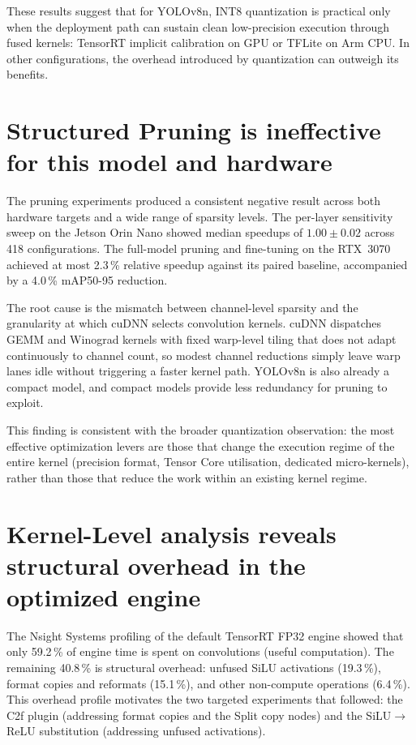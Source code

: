 \documentclass[12pt,a4paper]{report}
\begin{document}
These results suggest that for YOLOv8n, INT8 quantization is practical only when the deployment path can sustain clean
low-precision execution through fused kernels: TensorRT implicit calibration on GPU or TFLite on Arm CPU.
In other configurations, the overhead introduced by quantization can outweigh its benefits.

\section{Structured Pruning is ineffective for this model and hardware}

The pruning experiments produced a consistent negative result across both hardware targets and a wide range of sparsity
levels.
The per-layer sensitivity sweep on the Jetson Orin Nano showed median speedups of $1.00 \pm 0.02$ across 418 configurations.
The full-model pruning and fine-tuning on the RTX~3070 achieved at most 2.3\,\% relative speedup against its paired
baseline, accompanied by a 4.0\,\% mAP50-95 reduction.

The root cause is the mismatch between channel-level sparsity and the granularity at which cuDNN selects convolution
kernels.
cuDNN dispatches GEMM and Winograd kernels with fixed warp-level tiling that does not adapt continuously to channel
count, so modest channel reductions simply leave warp lanes idle without triggering a faster kernel path.
YOLOv8n is also already a compact model, and compact models provide less redundancy for pruning to exploit.

This finding is consistent with the broader quantization observation: the most effective optimization levers are those
that change the execution regime of the entire kernel (precision format, Tensor Core utilisation, dedicated
micro-kernels), rather than those that reduce the work within an existing kernel regime.

\section{Kernel-Level analysis reveals structural overhead in the optimized engine}

The Nsight Systems profiling of the default TensorRT FP32 engine showed that only 59.2\,\% of engine time is spent on
convolutions (useful computation).
The remaining 40.8\,\% is structural overhead: unfused SiLU activations (19.3\,\%), format copies and reformats
(15.1\,\%), and other non-compute operations (6.4\,\%).
This overhead profile motivates the two targeted experiments that followed: the C2f plugin (addressing format copies
and the Split copy nodes) and the SiLU$\to$ReLU substitution (addressing unfused activations).
\end{document}
